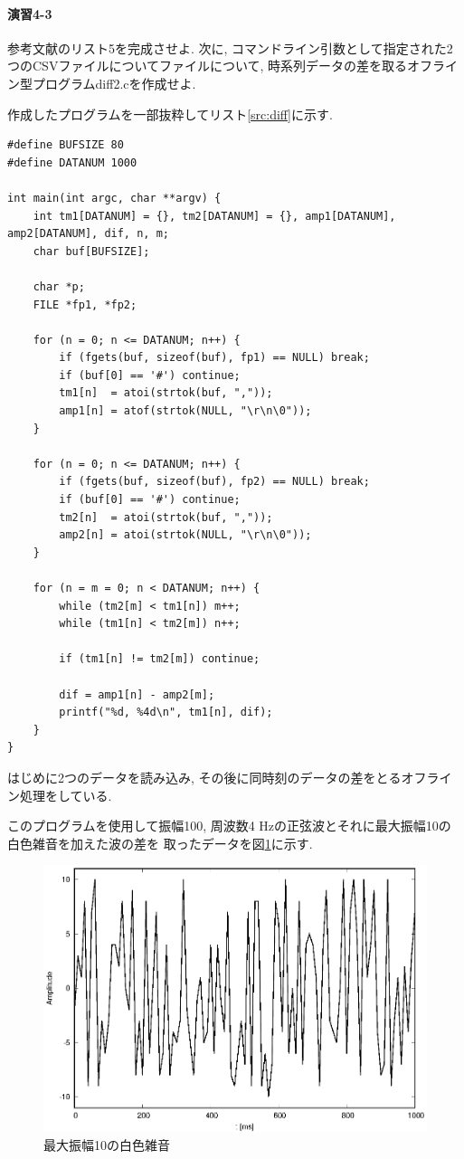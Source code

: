 \documentclass[titlepage]{jsarticle}
\begin{document}
    \paragraph{演習4-3} 参考文献\cite{Text}のリスト5を完成させよ.
    次に, コマンドライン引数として指定された2つのCSVファイルについてファイルについて,
    時系列データの差を取るオフライン型プログラムdiff2.cを作成せよ.

        作成したプログラムを一部抜粋してリスト\ref{src:diff}に示す.
        
        \begin{lstlisting}[caption=diff2.c, label=src:diff]
#define BUFSIZE 80
#define DATANUM 1000

int main(int argc, char **argv) {
    int tm1[DATANUM] = {}, tm2[DATANUM] = {}, amp1[DATANUM], amp2[DATANUM], dif, n, m;
    char buf[BUFSIZE];

    char *p;
    FILE *fp1, *fp2;

    for (n = 0; n <= DATANUM; n++) {
        if (fgets(buf, sizeof(buf), fp1) == NULL) break;
        if (buf[0] == '#') continue;
        tm1[n]  = atoi(strtok(buf, ","));
        amp1[n] = atof(strtok(NULL, "\r\n\0"));
    }

    for (n = 0; n <= DATANUM; n++) {
        if (fgets(buf, sizeof(buf), fp2) == NULL) break;
        if (buf[0] == '#') continue;
        tm2[n]  = atoi(strtok(buf, ","));
        amp2[n] = atoi(strtok(NULL, "\r\n\0"));
    }

    for (n = m = 0; n < DATANUM; n++) {
        while (tm2[m] < tm1[n]) m++;
        while (tm1[n] < tm2[m]) n++;

        if (tm1[n] != tm2[m]) continue;

        dif = amp1[n] - amp2[m];
        printf("%d, %4d\n", tm1[n], dif);
    }
}\end{lstlisting}

        はじめに2つのデータを読み込み, その後に同時刻のデータの差をとるオフライン処理をしている.

        このプログラムを使用して振幅100, 周波数4 Hzの正弦波とそれに最大振幅10の白色雑音を加えた波の差を
        取ったデータを図\ref{fig:diff}に示す.

        \begin{figure}[h]
            \centering
            \includegraphics[width=0.8\hsize]{images/diff.eps}
            \caption{最大振幅10の白色雑音}
            \label{fig:diff}
        \end{figure}
\end{document}
